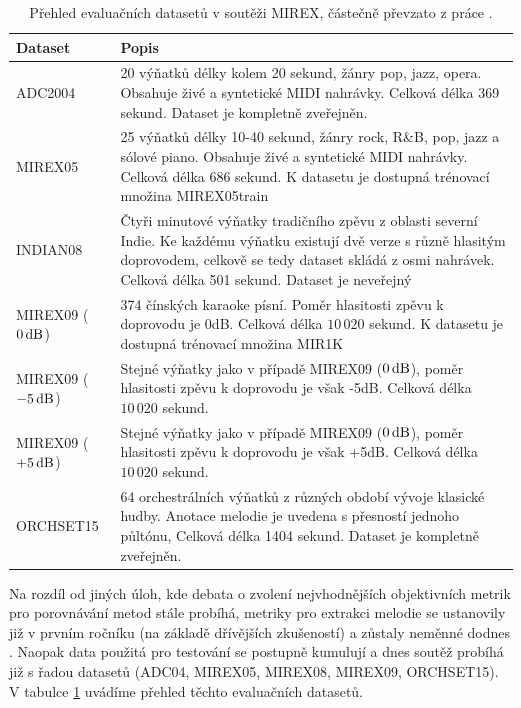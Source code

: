 \begin{table}[h!]
\centering
\begin{tabular}{p{2.5cm}p{11cm}}
\toprule
Dataset        & Popis \\
\midrule
ADC2004        & 20 výňatků délky kolem 20 sekund, žánry pop, jazz, opera. Obsahuje živé a syntetické MIDI nahrávky. Celková délka 369 sekund. Dataset je kompletně zveřejněn. \\
MIREX05        & 25 výňatků délky 10-40 sekund, žánry rock, R\&B, pop, jazz a sólové piano. Obsahuje živé a syntetické MIDI nahrávky. Celková délka 686 sekund. K datasetu je dostupná trénovací množina MIREX05train \\
INDIAN08       & Čtyři minutové výňatky tradičního zpěvu z oblasti severní Indie. Ke každému výňatku existují dvě verze s různě hlasitým doprovodem, celkově se tedy dataset skládá z osmi nahrávek. Celková délka 501 sekund. Dataset je neveřejný \\
MIREX09 ($0\,\rm dB$)  & 374 čínských karaoke písní. Poměr hlasitosti zpěvu k doprovodu je 0dB. Celková délka $10\,020$ sekund. K datasetu je dostupná trénovací množina MIR1K \\
MIREX09 ($-5\,\rm dB$) & Stejné výňatky jako v případě MIREX09 ($0\,\rm dB$), poměr hlasitosti zpěvu k doprovodu je však -5dB. Celková délka $10\,020$ sekund. \\
MIREX09 ($+5\,\rm dB$) & Stejné výňatky jako v případě MIREX09 ($0\,\rm dB$), poměr hlasitosti zpěvu k doprovodu je však +5dB. Celková délka $10\,020$ sekund. \\
ORCHSET15      & 64 orchestrálních výňatků z různých období vývoje klasické hudby. Anotace melodie je uvedena s přesností jednoho půltónu, Celková délka 1404 sekund. Dataset je kompletně zveřejněn. \\
\bottomrule
\end{tabular}
\caption{Přehled evaluačních datasetů v soutěži MIREX, částečně převzato z práce \cite{Salamon2014}.}\label{tab:mirex_datasety}
\end{table}

Na rozdíl od jiných úloh, kde debata o zvolení nejvhodnějších objektivních metrik pro porovnávání metod stále probíhá, metriky pro extrakci melodie se ustanovily již v prvním ročníku (na základě dřívějších zkušeností) a zůstaly neměnné dodnes \citep{Raffel2014}. Naopak data použitá pro testování se postupně kumulují a dnes soutěž probíhá již s řadou datasetů (ADC04, MIREX05, MIREX08, MIREX09, ORCHSET15). V tabulce \ref{tab:mirex_datasety} uvádíme přehled těchto evaluačních datasetů.

